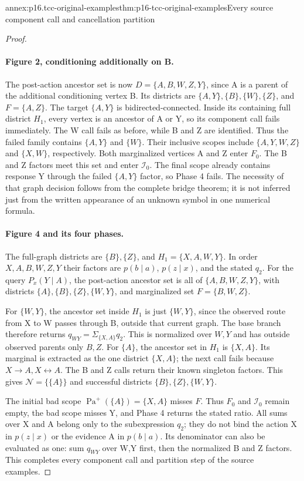 \begin{annexitem}{annex:p16.tcc-original-examples}{thm:p16-tcc-original-examples}{Every source component call and cancellation partition}
\begin{proof}
\paragraph{Figure 2, conditioning additionally on B.}
The post-action ancestor set is now \(D=\{A,B,W,Z,Y\}\),
since A is a parent of the additional conditioning vertex B.
Its districts are \(\{A,Y\},\{B\},\{W\},\{Z\}\),
and \(F=\{A,Z\}\). The target \(\{A,Y\}\) is
bidirected-connected. Inside its containing full district \(H_1\),
every vertex is an ancestor of A or Y, so its component call
fails immediately. The W call fails as before, while B and Z
are identified. Thus the failed family contains \(\{A,Y\}\)
and \(\{W\}\). Their inclusive scopes include
\(\{A,Y,W,Z\}\) and \(\{X,W\}\), respectively.
Both marginalized vertices A and Z enter \(F_0\). The B
and Z factors meet this set and enter \(\mathcal I_0\).
The final scope already contains response Y through the failed
\(\{A,Y\}\) factor, so Phase 4 fails. The necessity of
that graph decision follows from the complete bridge theorem;
it is not inferred just from the written appearance of an
unknown symbol in one numerical formula.

\paragraph{Figure 4 and its four phases.}
The full-graph districts are \(\{B\},\{Z\}\), and
\(H_1=\{X,A,W,Y\}\). In order \(X,A,B,W,Z,Y\)
their factors are \(p(b\mid a)\), \(p(z\mid x)\),
and the stated \(q_2\). For the query \(P_x(Y\mid A)\),
the post-action ancestor set is all of \(\{A,B,W,Z,Y\}\),
with districts \(\{A\},\{B\},\{Z\},\{W,Y\}\),
and marginalized set \(F=\{B,W,Z\}\).

For \(\{W,Y\}\), the ancestor set inside \(H_1\) is
just \(\{W,Y\}\), since the observed route from X to W
passes through B, outside that current graph. The base branch
therefore returns \(q_{WY}=\Sigma_{\{X,A\}}q_2\).
This is normalized over \(W,Y\) and has outside observed
parents only \(B,Z\). For \(\{A\}\), the ancestor
set in \(H_1\) is \(\{X,A\}\). Its marginal is
extracted as the one district \(\{X,A\}\); the next call
fails because \(X\to A,X\leftrightarrow A\). The B and
Z calls return their known singleton factors. This gives
\(\mathcal N=\{\{A\}\}\) and successful districts
\(\{B\},\{Z\},\{W,Y\}\).

The initial bad scope \(\operatorname{Pa}^{+}(\{A\})=\{X,A\}\)
misses \(F\). Thus \(F_0\) and \(\mathcal I_0\)
remain empty, the bad scope misses Y, and Phase 4 returns
the stated ratio. All sums over X and A belong only to the
subexpression \(q_2\); they do not bind the action X in
\(p(z\mid x)\) or the evidence A in \(p(b\mid a)\).
Its denominator can also be evaluated as one: sum \(q_{WY}\)
over W,Y first, then the normalized B and Z factors. This
completes every component call and partition step of the source examples.
\end{proof}
\end{annexitem}

